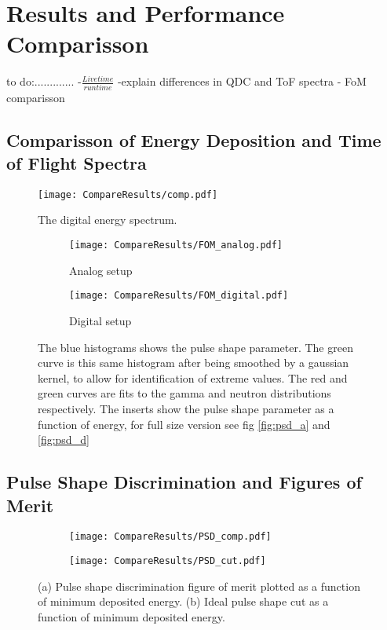 \documentclass[main.tex]{subfiles}
\begin{document}
\section{Results and Performance Comparisson}
to do:.............
\newline
-$\frac{Livetime}{runtime}$
\newline -explain differences in QDC and ToF spectra
\newline- FoM comparisson

\subsection{Comparisson of Energy Deposition and Time of Flight Spectra}
\begin{figure}[h]
    \centering
        \texttt{[image: CompareResults/comp.pdf]}
        \caption{The digital energy spectrum.}
    \label{fig:AD_comp}
\end{figure}

\begin{figure}[ht]
	\begin{subfigure}[b]{\textwidth}
	    \centering
    	    \texttt{[image: CompareResults/FOM\_analog.pdf]}
        	\caption{Analog setup}
	    \label{fig:fom_analog} 
	\end{subfigure}
	\begin{subfigure}[b]{\textwidth}
    	\centering
        	\texttt{[image: CompareResults/FOM\_digital.pdf]}
        	\caption{Digital setup}
    	\label{fig:fom_digital} 
    \end{subfigure}
    \caption{The blue histograms shows the pulse shape parameter. The green curve is this same histogram after being smoothed by a gaussian kernel, to allow for identification of extreme values. The red and green curves are fits to the gamma and neutron distributions respectively. The inserts show the pulse shape parameter as a function of energy, for full size version see fig \ref{fig:psd_a} and \ref{fig:psd_d}}
\end{figure}

\subsection{Pulse Shape Discrimination and Figures of Merit}

\begin{figure}[ht]
	\begin{subfigure}[b]{\textwidth}
	    \centering
    	\texttt{[image: CompareResults/PSD\_comp.pdf]}
        \caption{}
	    \label{fig:psd_fom_trend} 
	\end{subfigure}
	\begin{subfigure}[b]{\textwidth}
    	\centering
        \texttt{[image: CompareResults/PSD\_cut.pdf]}
        \caption{}
    	\label{fig:psd_cut_trend} 
    \end{subfigure}
    \caption{(a) Pulse shape discrimination figure of merit plotted as a function 	of minimum deposited energy. (b) Ideal pulse shape cut as a function of minimum deposited energy.}
\end{figure}
\end{document}
